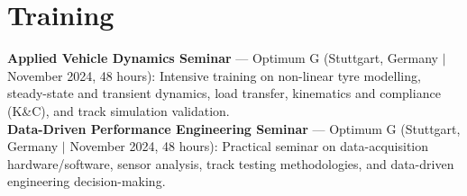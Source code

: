\documentclass[a4paper,11pt]{article}
\begin{document}
\section{Training}
 \begin{itemize}[leftmargin=0.15in, label={}]
    \small{\item{
     \textbf{Applied Vehicle Dynamics Seminar} --- Optimum G (Stuttgart, Germany $|$ November 2024, 48 hours): Intensive training on non-linear tyre modelling, steady-state and transient dynamics, load transfer, kinematics and compliance (K\&C), and track simulation validation. \\
     \vspace{1pt}
     \textbf{Data-Driven Performance Engineering Seminar} --- Optimum G (Stuttgart, Germany $|$ November 2024, 48 hours): Practical seminar on data-acquisition hardware/software, sensor analysis, track testing methodologies, and data-driven engineering decision-making.
    }}
 \end{itemize}
\end{document}

